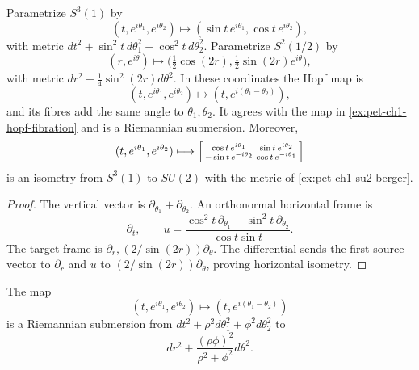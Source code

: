 \begin{example}
  \label{ex:pet-ch1-hopf-revisited}
  \leanok
  Parametrize $S^3(1)$ by
  \[
    (t,e^{i\theta_1},e^{i\theta_2})
      \longmapsto(\sin t\,e^{i\theta_1},\cos t\,e^{i\theta_2}),
  \]
  with metric
  $dt^2+\sin^2t\,d\theta_1^2+\cos^2t\,d\theta_2^2$. Parametrize
  $S^2(1/2)$ by
  \[
    (r,e^{i\theta})\longmapsto
      \big(\tfrac12\cos(2r),\tfrac12\sin(2r)e^{i\theta}\big),
  \]
  with metric $dr^2+\tfrac14\sin^2(2r)d\theta^2$. In these coordinates the
  Hopf map is
  \[
    (t,e^{i\theta_1},e^{i\theta_2})
      \longmapsto(t,e^{i(\theta_1-\theta_2)}),
  \]
  and its fibres add the same angle to $\theta_1,\theta_2$. It agrees with the
  map in \cref{ex:pet-ch1-hopf-fibration} and is a Riemannian submersion.
  Moreover,
  \[
    (t,e^{i\theta_1},e^{i\theta_2})\longmapsto
    \begin{bsmallmatrix}
      \cos t\,e^{i\theta_1}&\sin t\,e^{i\theta_2}\\
      -\sin t\,e^{-i\theta_2}&\cos t\,e^{-i\theta_1}
    \end{bsmallmatrix}
  \]
  is an isometry from $S^3(1)$ to $SU(2)$ with the metric of
  \cref{ex:pet-ch1-su2-berger}.
\end{example}
\begin{proof}
  \leanok
  \sketch
  The vertical vector is $\partial_{\theta_1}+\partial_{\theta_2}$. An
  orthonormal horizontal frame is
  \[
    \partial_t,\qquad
    u=\frac{\cos^2t\,\partial_{\theta_1}
              -\sin^2t\,\partial_{\theta_2}}{\cos t\sin t}.
  \]
  The target frame is
  $\partial_r,(2/\sin(2r))\partial_\theta$. The differential sends the first
  source vector to $\partial_r$ and $u$ to
  $(2/\sin(2r))\partial_\theta$, proving horizontal isometry.
\end{proof}

\begin{example}
  \label{ex:pet-ch1-hopf-general-submersion}
  \leanok
  The map
  \[
    (t,e^{i\theta_1},e^{i\theta_2})
      \longmapsto(t,e^{i(\theta_1-\theta_2)})
  \]
  is a Riemannian submersion from
  $dt^2+\rho^2d\theta_1^2+\phi^2d\theta_2^2$ to
  \[
    dr^2+\frac{(\rho\phi)^2}{\rho^2+\phi^2}d\theta^2.
  \]
\end{example}

